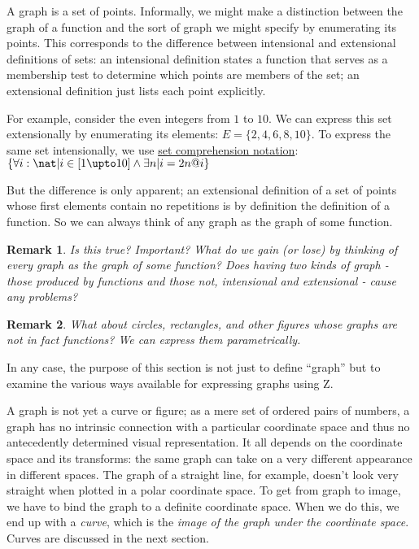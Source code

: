 \documentclass[12pt]{tufte-handout}
\numberwithin{equation}{subsection}
\numberwithin{equation}{subsection}
\newtheorem{remark}{Remark}
\newcommand\cspace{coordinate space}
\begin{document}
  A graph is a set of points.  Informally, we might make a distinction
  between the graph of a function and the sort of graph we might
  specify by enumerating its points.  This corresponds to the
  difference between intensional and extensional definitions of sets:
  an intensional definition states a function that serves as a
  membership test to determine which points are members of the set; an
  extensional definition just lists each point explicitly.

  For example, consider the even integers from \(1\) to \(10\).  We
  can express this set extensionally by enumerating its elements: \(E
  = \{2,4,6,8,10\}\).  To express the same set intensionally, we use
  \hyperref[subs:setcomp]{set comprehension notation}: \(\{\forall
  i:\nat | i\in [1\upto 10] \land \exists n | i = 2n @ i \}\)

  But the difference is only apparent; an extensional definition of a
  set of points whose first elements contain no repetitions is by
  definition the definition of a function.  So we can always think of
  any graph as the graph of some function.

  \begin{remark}
    Is this true?  Important?  What do we gain (or lose) by thinking
    of every graph as the graph of some function?  Does having two
    kinds of graph - those produced by functions and those not,
    intensional and extensional - cause any problems?
  \end{remark}

  \begin{remark}
    What about circles, rectangles, and other figures whose graphs are
    not in fact functions?  We can express them parametrically.
  \end{remark}

  {\todo In any case, the purpose of this section is not just to
    define ``graph'' but to examine the various ways available for
    expressing graphs using Z.}

  A graph is not yet a curve or figure; as a mere set of ordered pairs
  of numbers, a graph has no intrinsic connection with a
  particular \cspace{} and thus no antecedently determined visual
  representation.  It all depends on the \cspace{} and its transforms:
  the same graph can take on a very different appearance in different
  spaces.  The graph of a straight line, for example, doesn't look
  very straight when plotted in a polar \cspace{}.  To get from graph
  to image, we have to bind the graph to a definite \cspace{}.  When
  we do this, we end up with a \textit{curve}, which is the
  \textit{image of the graph under the \cspace{}}.  Curves are
  discussed in the next section.
\end{document}
